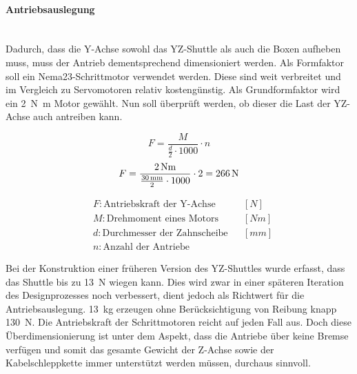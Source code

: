 \paragraph{Antriebsauslegung}\mbox{}\\
Dadurch, dass die Y-Achse sowohl das YZ-Shuttle als auch die Boxen aufheben muss, muss der Antrieb dementsprechend dimensioniert werden. Als Formfaktor soll ein Nema23-Schrittmotor verwendet werden. Diese sind weit verbreitet und im Vergleich zu Servomotoren relativ kostengünstig. Als Grundformfaktor wird ein \SI{2}{\newton\meter} Motor gewählt. Nun soll überprüft werden, ob dieser die Last der YZ-Achse auch antreiben kann.

\vspace{5mm}
\noindent\begin{minipage}{\textwidth}
\begin{minipage}[t]{0.5\textwidth}
    \begin{equation*}
        F = \frac{M}{\frac{d}{2} \cdot 1000} \cdot n
    \end{equation*}
    \begin{equation*}
        F = \frac{2 \, \mathrm{Nm}}{\frac{30 \, \mathrm{mm}}{2} \cdot 1000} \cdot 2 = 266 \, \mathrm{N}
    \end{equation*}
\end{minipage}%
\begin{minipage}[t]{0.4\textwidth}
    \vspace*{-5mm}
    \begin{align*}
        &F: \text{Antriebskraft der Y-Achse} & &\left[N\right]\\
        &M: \text{Drehmoment eines Motors} & &\left[Nm\right]\\
        &d: \text{Durchmesser der Zahnscheibe} & &\left[mm\right]\\
        &n: \text{Anzahl der Antriebe} & &
    \end{align*}
\end{minipage}
\end{minipage}

\vspace{5mm}

Bei der Konstruktion einer früheren Version des YZ-Shuttles wurde erfasst, dass das Shuttle bis zu \SI{13}{\newton} wiegen kann. Dies wird zwar in einer späteren Iteration des Designprozesses noch verbessert, dient jedoch als Richtwert für die Antriebsauslegung. \SI{13}{kg} erzeugen ohne Berücksichtigung von Reibung knapp  \SI{130}{\newton}. Die Antriebskraft der Schrittmotoren reicht auf jeden Fall aus. Doch diese Überdimensionierung ist unter dem Aspekt, dass die Antriebe über keine Bremse verfügen und somit das gesamte Gewicht der Z-Achse sowie der Kabelschleppkette immer unterstützt werden müssen, durchaus sinnvoll.


